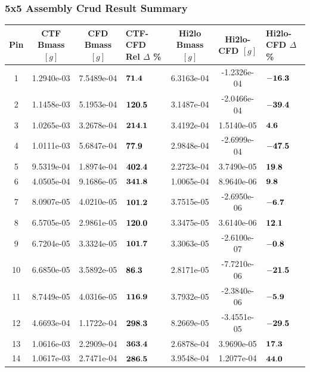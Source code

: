 \documentclass[t, pdftex]{beamer}
\begin{document}
\begin{frame}
\frametitle{5x5 Assembly Crud Result Summary}
\vspace{-8pt}
\begin{table}[h]
    \tiny
    \begin{center}
        \begin{tabular}[h]{|c|c|c|M|c|c|M|}
            \hline
            Pin & CTF Bmass $[g]$ & CFD Bmass $[g]$ & \textbf{CTF-CFD Rel $\Delta$ \%} & Hi2lo Bmass $[g]$ & Hi2lo-CFD $[g]$ & \textbf{Hi2lo-CFD $\Delta$ \%} \\
              &  1.2940e-03 & 7.5489e-04  & $\bf{71.4  }$  & 6.3163e-04 & -1.2326e-04 &  $\bf{-16.3}$ \\
 2  &  1.1458e-03 & 5.1953e-04  & $\bf{120.5 }$  & 3.1487e-04 & -2.0466e-04 & $\bf{ -39.4}$ \\
 3  &  1.0265e-03 & 3.2678e-04  & $\bf{214.1 }$  & 3.4192e-04 & 1.5140e-05 & $\bf{ 4.6 }$ \\
 4  &  1.0111e-03 & 5.6847e-04  & $\bf{77.9  }$  & 2.9848e-04 & -2.6999e-04 &  $\bf{-47.5}$ \\
 5  &  9.5319e-04 & 1.8974e-04  & $\bf{402.4 }$  & 2.2723e-04 & 3.7490e-05 & $\bf{ 19.8 }$ \\
 6  &  4.0505e-04 & 9.1686e-05  & $\bf{341.8 }$  & 1.0065e-04 & 8.9640e-06 & $\bf{ 9.8 }$ \\
 7  &  8.0907e-05 & 4.0210e-05  & $\bf{101.2 }$  & 3.7515e-05 & -2.6950e-06 & $\bf{ -6.7}$ \\
 8  &  6.5705e-05 & 2.9861e-05  & $\bf{120.0 }$  & 3.3475e-05 & 3.6140e-06 & $\bf{ 12.1 }$ \\
 9  &  6.7204e-05 & 3.3324e-05  & $\bf{101.7 }$  & 3.3063e-05 & -2.6100e-07 & $\bf{ -0.8}$ \\
 10  & 6.6850e-05 & 3.5892e-05  & $\bf{86.3  }$  & 2.8171e-05 & -7.7210e-06 & $\bf{ -21.5}$ \\
 11  & 8.7449e-05 & 4.0316e-05  & $\bf{116.9 }$  & 3.7932e-05 & -2.3840e-06 & $\bf{ -5.9}$ \\
 12  & 4.6693e-04 & 1.1722e-04  & $\bf{298.3 }$  & 8.2669e-05 & -3.4551e-05 & $\bf{ -29.5}$ \\
 13  & 1.0616e-03 & 2.2909e-04  & $\bf{363.4 }$  & 2.6878e-04 & 3.9690e-05 & $\bf{ 17.3 }$ \\
 14  & 1.0617e-03 & 2.7471e-04  & $\bf{286.5 }$  & 3.9548e-04 & 1.2077e-04 & $\bf{ 44.0 }$ \\

\end{tabular}
\end{center}
\end{table}
\end{frame}
\end{document}
